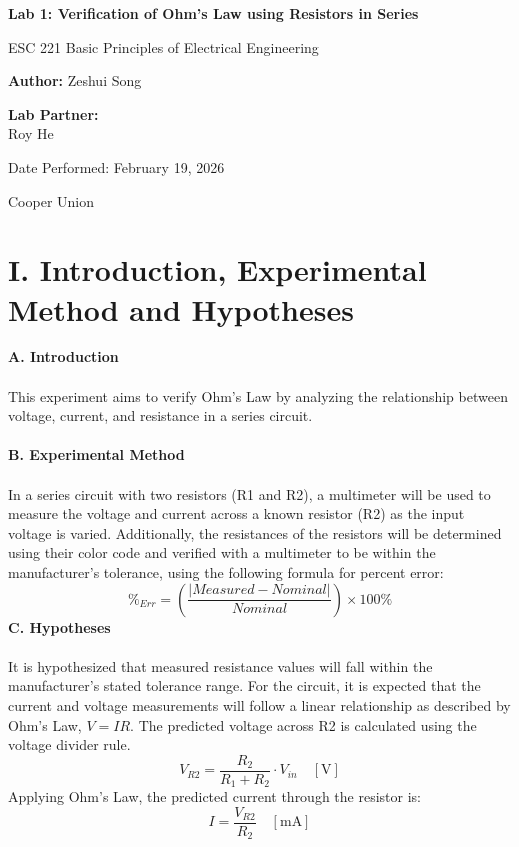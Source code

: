 \documentclass[12pt]{article}
\title{}
\date{}
\author{}
\begin{document}
\begin{titlepage}
    \centering
    \vspace*{1in}

    {\Large\bfseries Lab 1: Verification of Ohm's Law using Resistors in Series \par}
    \vspace{1.5cm}

    {\large ESC 221 Basic Principles of Electrical Engineering \par}
    \vspace{2cm}

    {\large \textbf{Author:} Zeshui Song \par}
    \vspace{0.5cm}

    {\large \textbf{Lab Partner:}} \\
    Roy He
    \vfill

    {\large Date Performed: February 19, 2026 \par}
    \vspace{0.8cm}

    {\large Cooper Union \par}

    \vspace*{1in}
\end{titlepage}
\newpage

\section*{I. Introduction, Experimental Method and Hypotheses}
\textbf{A. Introduction}\\\\
This experiment aims to verify Ohm's Law by analyzing the relationship between voltage, current, and resistance in a series circuit.\\\\
\textbf{B. Experimental Method}\\\\
In a series circuit with two resistors (R1 and R2), a multimeter will be used to measure the voltage and current across a known resistor (R2) as the input voltage is varied. Additionally, the resistances of the resistors will be determined using their color code and verified with a multimeter to be within the manufacturer's tolerance, using the following formula for percent error:
\[\%_{Err} = \left( \frac{|Measured - Nominal|}{Nominal} \right) \times 100\%\]
\textbf{C. Hypotheses}\\\\
It is hypothesized that measured resistance values will fall within the manufacturer's stated tolerance range. For the circuit, it is expected that the current and voltage measurements will follow a linear relationship as described by Ohm's Law, $V = IR$. The predicted voltage across R2 is calculated using the voltage divider rule.
\[V_{R2} = \frac{R_2}{R_1 + R_2} \cdot V_{in}\quad[\text{V}]\]
Applying Ohm's Law, the predicted current through the resistor is:
\[I = \frac{V_{R2}}{R_2}\quad[\text{mA}]\]
\end{document}
